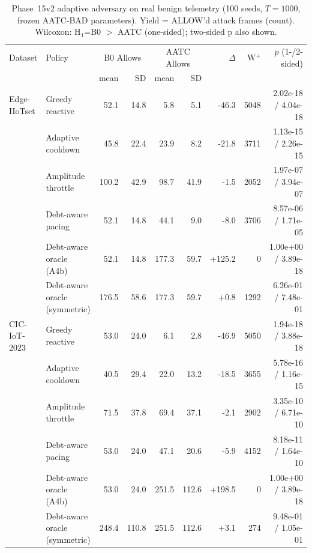 \begin{table}[t]
\centering
\caption{Phase~15v2 adaptive adversary on real benign telemetry (100 seeds, $T{=}1000$, frozen AATC-BAD parameters). Yield = ALLOW'd attack frames (count). Wilcoxon: H$_1$=B0 $>$ AATC (one-sided); two-sided p also shown.}
\label{tab:phase15v2}
\setlength{\tabcolsep}{3.5pt}
\begin{tabular}{llrrrrrrr}
\toprule
Dataset & Policy & \multicolumn{2}{c}{B0 Allows} & \multicolumn{2}{c}{AATC Allows} & $\Delta$ & W$^+$ & $p$ (1-/2-sided) \\
\cmidrule(lr){3-4}\cmidrule(lr){5-6}
& & mean & SD & mean & SD & & & \\
\midrule
Edge-IIoTset & Greedy reactive & 52.1 & 14.8 & 5.8 & 5.1 & -46.3 & 5048 & 2.02e-18 / 4.04e-18 \\
 & Adaptive cooldown & 45.8 & 22.4 & 23.9 & 8.2 & -21.8 & 3711 & 1.13e-15 / 2.26e-15 \\
 & Amplitude throttle & 100.2 & 42.9 & 98.7 & 41.9 & -1.5 & 2052 & 1.97e-07 / 3.94e-07 \\
 & Debt-aware pacing & 52.1 & 14.8 & 44.1 & 9.0 & -8.0 & 3706 & 8.57e-06 / 1.71e-05 \\
 & Debt-aware oracle (A4b) & 52.1 & 14.8 & 177.3 & 59.7 & +125.2 & 0 & 1.00e+00 / 3.89e-18 \\
 & Debt-aware oracle (symmetric) & 176.5 & 58.6 & 177.3 & 59.7 & +0.8 & 1292 & 6.26e-01 / 7.48e-01 \\
\midrule
CIC-IoT-2023 & Greedy reactive & 53.0 & 24.0 & 6.1 & 2.8 & -46.9 & 5050 & 1.94e-18 / 3.88e-18 \\
 & Adaptive cooldown & 40.5 & 29.4 & 22.0 & 13.2 & -18.5 & 3655 & 5.78e-16 / 1.16e-15 \\
 & Amplitude throttle & 71.5 & 37.8 & 69.4 & 37.1 & -2.1 & 2902 & 3.35e-10 / 6.71e-10 \\
 & Debt-aware pacing & 53.0 & 24.0 & 47.1 & 20.6 & -5.9 & 4152 & 8.18e-11 / 1.64e-10 \\
 & Debt-aware oracle (A4b) & 53.0 & 24.0 & 251.5 & 112.6 & +198.5 & 0 & 1.00e+00 / 3.89e-18 \\
 & Debt-aware oracle (symmetric) & 248.4 & 110.8 & 251.5 & 112.6 & +3.1 & 274 & 9.48e-01 / 1.05e-01 \\
\bottomrule
\end{tabular}
\end{table}